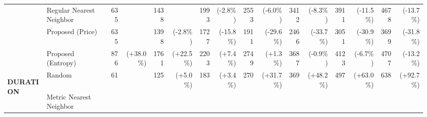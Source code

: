 \begin{table}
{\begin{tabular}{l|l|r@{~}r|r@{~}r|r@{~}r|r@{~}r|r@{~}r|r@{~}r|r@{~}r|}
                    & Regular Nearest Neighbor  & 635  & 
                                                & 1438 & 
                                                & 1993 & {\color{green}(-2.8\%)} 
                                                & 2553 & {\color{green}(-6.0\%)}
                                                & 3412 & {\color{green}(-8.3\%)}
                                                & 3911 & {\color{green}(-11.5\%)}
                                                & 4678 & {\color{green}(-13.7\%)} \\
                            & Proposed (Price)   & 635  & 
                                                & 1398 & {\color{green}(-2.8\%)}
                                                & 1727 & {\color{green}(-15.8\%)}
                                                & 1911 & {\color{green}(-29.6\%)}
                                                & 2466 & {\color{green}(-33.7\%)}
                                                & 3051 & {\color{green}(-30.9\%)}
                                                & 3699 & {\color{green}(-31.8\%)} \\
                            & Proposed (Entropy)& 876 & {\color{red}(+38.0\%)} 
                                                & 1761 & {\color{red}(+22.5\%)}
                                                & 2203 & {\color{red}(+7.4\%)}
                                                & 2749 & {\color{red}(+1.3\%)}
                                                & 3687 & {\color{green}(-0.9\%)}
                                                & 4123 & {\color{green}(-6.7\%)}
                                                & 4707 & {\color{green}(-13.2\%)} \\ \hline
  \multirow{4}{*}{\begin{sideways}\hspace*{-4ex}\textbf{DURATION}\end{sideways}} 
                            & Random            & 61   & 
                                                & 125  & {\color{red}(+5.0\%)} 
                                                & 183  & {\color{red}(+3.4\%)} 
                                                & 270  & {\color{red}(+31.7\%)} 
                                                & 369  & {\color{red}(+48.2\%)} 
                                                & 497  & {\color{red}(+63.0\%)} 
                                                & 638  & {\color{red}(+92.7\%)}  \\
                            & \cellcolor{Gray}Metric Nearest Neighbor        

\end{tabular}}
\end{table}
